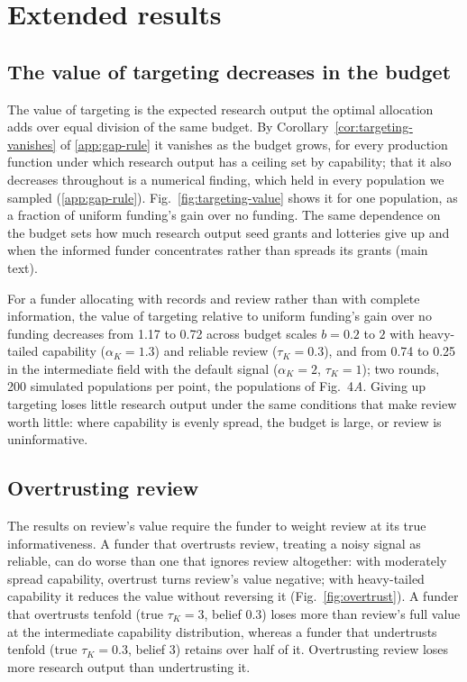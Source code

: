 \section{Extended results}\label{si:extended}

\subsection*{The value of targeting decreases in the budget}
The value of targeting is the expected research output the optimal allocation adds over equal division of the same budget. By Corollary~\ref{cor:targeting-vanishes} of \ref{app:gap-rule} it vanishes as the budget grows, for every production function under which research output has a ceiling set by capability; that it also decreases throughout is a numerical finding, which held in every population we sampled (\ref{app:gap-rule}). Fig.~\ref{fig:targeting-value} shows it for one population, as a fraction of uniform funding's gain over no funding. The same dependence on the budget sets how much research output seed grants and lotteries give up and when the informed funder concentrates rather than spreads its grants (main text).



For a funder allocating with records and review rather than with complete information, the value of targeting relative to uniform funding's gain over no funding decreases from 1.17 to 0.72 across budget scales $b = 0.2$ to $2$ with heavy-tailed capability ($\alpha_K = 1.3$) and reliable review ($\tau_K = 0.3$), and from 0.74 to 0.25 in the intermediate field with the default signal ($\alpha_K = 2$, $\tau_K = 1$); two rounds, 200 simulated populations per point, the populations of Fig.~4\textit{A}. Giving up targeting loses little research output under the same conditions that make review worth little: where capability is evenly spread, the budget is large, or review is uninformative.

\subsection*{Overtrusting review}
The results on review's value require the funder to weight review at its true informativeness. A funder that overtrusts review, treating a noisy signal as reliable, can do worse than one that ignores review altogether: with moderately spread capability, overtrust turns review's value negative; with heavy-tailed capability it reduces the value without reversing it (Fig.~\ref{fig:overtrust}). A funder that overtrusts tenfold (true $\tau_K = 3$, belief $0.3$) loses more than review's full value at the intermediate capability distribution, whereas a funder that undertrusts tenfold (true $\tau_K = 0.3$, belief $3$) retains over half of it. Overtrusting review loses more research output than undertrusting it.

